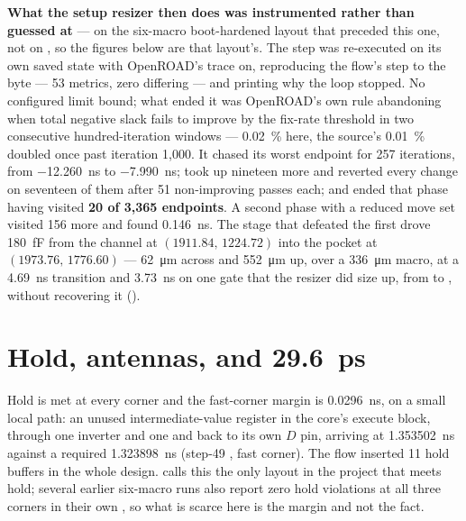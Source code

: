 \textbf{What the setup resizer then does was instrumented rather than
guessed at} --- on the six-macro boot-hardened layout that preceded this
one, not on , so the figures below are that layout's.
The step was re-executed on its own saved state with OpenROAD's
 trace on, reproducing the flow's step to the byte
--- 53 metrics, zero differing --- and printing why the loop stopped. No
configured limit bound; what ended it was OpenROAD's own rule abandoning
 when total negative slack fails to improve by the
fix-rate threshold in two consecutive hundred-iteration windows ---
\qty{0.02}{\percent} here, the source's \qty{0.01}{\percent} doubled
once past iteration 1,000. It chased its worst endpoint for 257
iterations, from \qty{-12.260}{\nano\second} to
\qty{-7.990}{\nano\second}; took up nineteen more and reverted every
change on seventeen of them after 51 non-improving passes each; and
ended that phase having visited \textbf{20 of 3,365 endpoints}. A second
phase with a reduced move set visited 156 more and found
\qty{0.146}{\nano\second}. The stage that defeated the first drove
\qty{180}{\femto\farad} from the channel at
$(1911.84,\,1224.72)$ into the pocket at $(1973.76,\,1776.60)$ ---
\qty{62}{\um} across and \qty{552}{\um} up, over a
\qty{336}{\um} macro, at a \qty{4.69}{\nano\second} transition
and \qty{3.73}{\nano\second} on one gate that the resizer did size up,
from  to , without recovering it
().

\section{Hold, antennas, and \qty{29.6}{\pico\second}}

Hold is met at every corner and the fast-corner margin is
\qty{+0.0296}{\nano\second}, on a small local path: an unused
intermediate-value register in the core's execute block, through one
inverter and one  and back to its own $D$ pin,
arriving at \qty{1.353502}{\nano\second} against a required
\qty{1.323898}{\nano\second} (step-49 , fast corner). The
flow inserted 11 hold buffers in the whole design.
 calls this the only layout in the project that
meets hold; several earlier six-macro runs also report zero hold
violations at all three corners in their own ,
so what is scarce here is the margin and not the fact.

